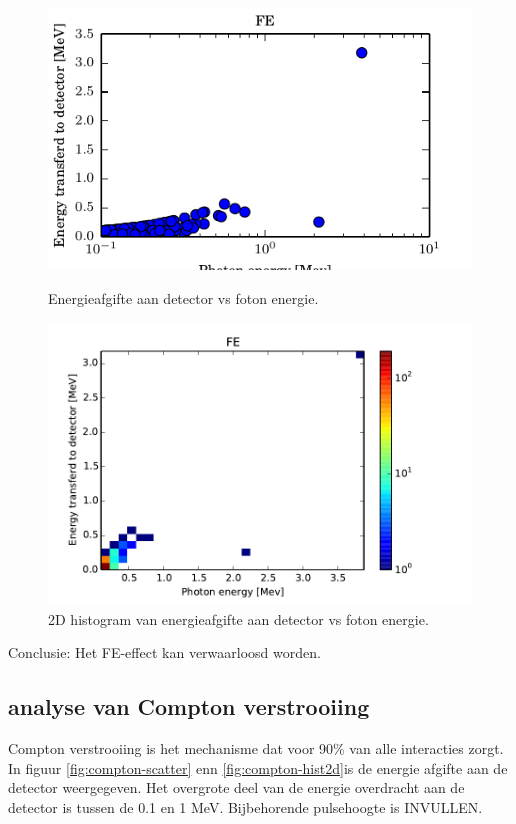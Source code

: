 \documentclass[a4paper,11pt]{article}
\begin{document}
\begin{figure}[t]
  \begin{center}
    \includegraphics{fig-fe-scatter.pdf}
    \caption{\label{fig:fe-scatter} Energieafgifte aan detector vs foton energie.}
  \end{center}
  \begin{center}
    \includegraphics{fig-fe-hist2d.pdf}
    \caption{\label{fig:fe-hist2d} 2D histogram van energieafgifte aan detector vs foton energie.}
  \end{center}
\end{figure}

Conclusie: Het FE-effect kan verwaarloosd worden.

\subsection{analyse van Compton verstrooiing}
Compton verstrooiing is het mechanisme dat voor 90\% van alle interacties zorgt. In figuur \ref{fig:compton-scatter} enn \ref{fig:compton-hist2d}is de energie afgifte aan de detector weergegeven. Het overgrote deel van de energie overdracht aan de detector is tussen de 0.1 en 1 MeV. Bijbehorende pulsehoogte is INVULLEN.
\end{document}

